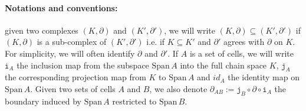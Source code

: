 \documentclass[runningheads]{llncs}
\newcommand\Span{\mathrm{Span}\,}
\newcommand{\dr}{\partial}
\newcommand{\inc}[2]{\mathtt{i}_{#1}}
\newcommand{\proj}[2]{\mathtt{j}_{#2}}
\newcommand{\cplx}{{(K,\partial)} }
\newcommand{\cplxp}{{(K',\partial')} }
\newcommand{\cplxpdr}{{(K',\partial)} }
\newcommand\id{id}
\newcommand{\add}[1]{{#1}}%
\begin{document}
\paragraph{Notations and conventions:} %
given two complexes $\cplx$ and $\cplxp$, we will write $\cplx \subseteq \cplxp$ if $\cplx$ is a sub-complex of $\cplxp$ i.e. if $K\subseteq K'$ and $\dr'$ agrees with $\dr$ on $K$. %
For simplicity, we will often identify $\dr$ and $\dr'$. %
If $A$ is a set of cells, we will write $\inc{A}{}$ the inclusion map from \add{the subspace $\Span A$ into the full chain space $K$, $\proj{}{A}$ the corresponding projection map from $K$ to $\Span A$} and $\id_{A}$ the identity map on $\Span A$.
Given two sets of cells $A$ and $B$, we also denote $\dr_{AB} := \proj{}{ B}\circ \dr \circ \inc{ A}{}$ the boundary induced by $\Span A$ restricted to $\Span B$.
\end{document}
